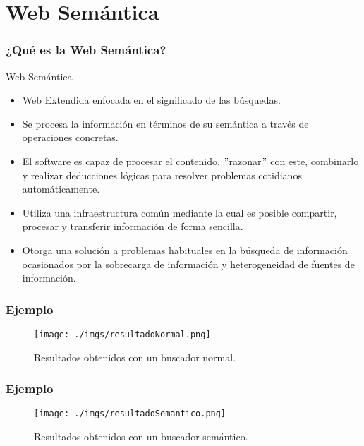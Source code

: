 \documentclass{beamer}
\begin{document}
\section{Web Semántica} 
\begin{frame}
\frametitle{¿Qué es la Web Semántica?} 
\begin{block}{Web Semántica}
\begin{itemize}
\item<1-> Web Extendida enfocada en el significado de las búsquedas.
\item<2-> Se procesa la información en términos de su semántica a través de operaciones concretas.
\item<3-> El software es capaz de procesar el contenido, $"$razonar$"$ con este, combinarlo y realizar deducciones lógicas para resolver problemas cotidianos automáticamente.
\item<4-> Utiliza una infraestructura común mediante la cual es posible compartir, procesar y transferir información de forma sencilla.
\item<5-> Otorga una solución a problemas habituales en la búsqueda de información ocasionados por la sobrecarga de información y heterogeneidad de fuentes de información.
\end{itemize}
\end{block}
\end{frame}
\begin{frame}
\frametitle{Ejemplo} 
\begin{figure}[H] %
\begin{center}
\texttt{[image: ./imgs/resultadoNormal.png]}
\caption{Resultados obtenidos con un buscador normal.}
\end{center}
\end{figure}
\end{frame}
\begin{frame}
\frametitle{Ejemplo} 
\begin{figure}[H] %
\begin{center}
\texttt{[image: ./imgs/resultadoSemantico.png]}
\caption{Resultados obtenidos con un buscador semántico.}
\end{center}
\end{figure}
\end{frame}
\end{document}
